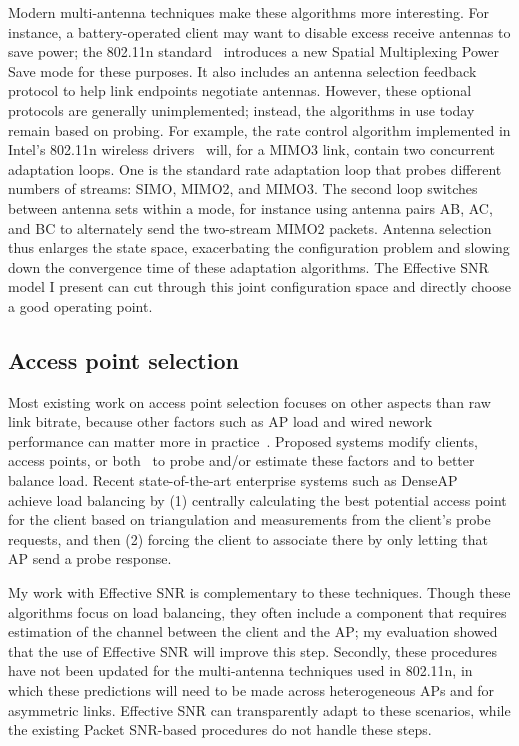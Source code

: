 Modern multi-antenna techniques make these algorithms more interesting. For instance, a battery-operated client may want to disable excess receive antennas to save power; the 802.11n standard~\cite{80211n} introduces a new Spatial Multiplexing Power Save mode for these purposes. It also includes an antenna selection feedback protocol to help link endpoints negotiate antennas. However, these optional protocols are generally unimplemented; instead, the algorithms in use today remain based on probing. For example, the rate control algorithm implemented in Intel's 802.11n wireless drivers~\cite{iwlwifi} will, for a MIMO3 link, contain two concurrent adaptation loops. One is the standard rate adaptation loop that probes different numbers of streams: SIMO, MIMO2, and MIMO3. The second loop switches between antenna sets within a mode, for instance using antenna pairs AB, AC, and BC to alternately send the two-stream MIMO2 packets. Antenna selection thus enlarges the state space, exacerbating the configuration problem and slowing down the convergence time of these adaptation algorithms. The Effective SNR model I present can cut through this joint configuration space and directly choose a good operating point.

\subsection{Access point selection}
Most existing work on access point selection focuses on other aspects than raw link bitrate, because other factors such as AP load and wired nework performance can matter more in practice~\cite{Balachandran_AP,Judd_AP}. Proposed systems modify clients, access points, or both~\cite{Balachandran_AP,Berjerano_AP,Nicholson_AP,Vasudevan_AP} to probe and/or estimate these factors and to better balance load. Recent state-of-the-art enterprise systems such as DenseAP~\cite{Murty_DenseAP} achieve load balancing by (1) centrally calculating the best potential access point for the client based on triangulation and measurements from the client's probe requests, and then (2) forcing the client to associate there by only letting that AP send a probe response.

My work with Effective SNR is complementary to these techniques. Though these algorithms focus on load balancing, they often include a component that requires estimation of the channel between the client and the AP; my evaluation showed that the use of Effective SNR will improve this step. Secondly, these procedures have not been updated for the multi-antenna techniques used in 802.11n, in which these predictions will need to be made across heterogeneous APs and for asymmetric links. Effective SNR can transparently adapt to these scenarios, while the existing Packet SNR-based procedures do not handle these steps.

